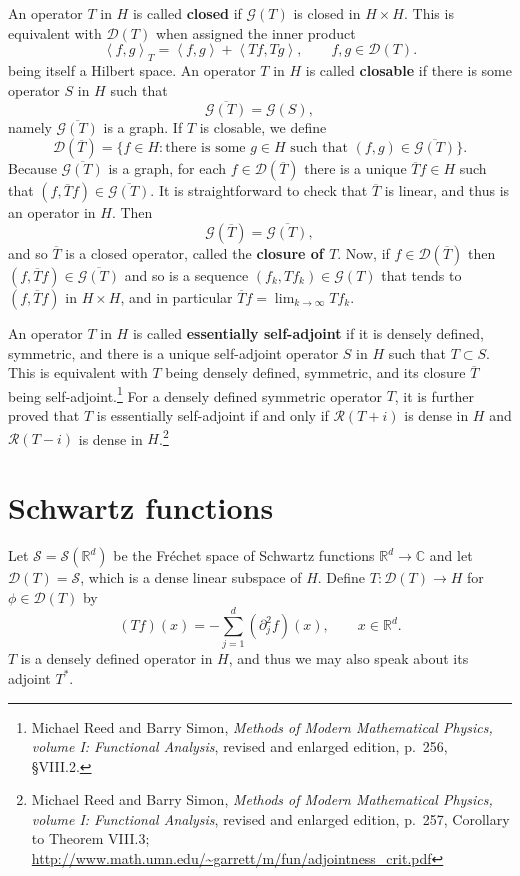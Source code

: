 \documentclass{article}
\newcommand{\inner}[2]{\left\langle #1, #2 \right\rangle}
\theoremstyle{definition}
\begin{document}
An operator $T$ in $H$ is called \textbf{closed} if $\mathscr{G}(T)$ is closed in $H \times H$. 
This is equivalent with $\mathscr{D}(T)$ when assigned the inner product
\begin{equation}
\inner{f}{g}_T = \inner{f}{g}+\inner{Tf}{Tg}, \qquad f,g \in \mathscr{D}(T).
\label{subspace}
\end{equation}
being itself a Hilbert space. 
An operator $T$ in $H$ is called \textbf{closable} if there is some operator $S$ in
$H$ such that 
\[
\overline{\mathscr{G}(T)} = \mathscr{G}(S),
\]
namely $\overline{\mathscr{G}(T)}$ is a graph.
If $T$ is closable, we define
\[
\mathscr{D}(\overline{T}) = \{f \in H: \textrm{there is some $g \in H$ such that $(f,g) \in \overline{\mathscr{G}(T)}$}\}. 
\]
Because $\overline{\mathscr{G}(T)}$ is a graph, for each $f \in \mathscr{D}(\overline{T})$ there is a unique
$\overline{T}f \in H$ such that $(f,\overline{T}f) \in \overline{\mathscr{G}(T)}$. 
It is straightforward to check that $\overline{T}$ is linear, and thus is an operator in $H$.
Then
\[
\mathscr{G}(\overline{T}) = \overline{\mathscr{G}(T)},
\]
and so $\overline{T}$ is a closed operator, called the \textbf{closure of $T$}.
Now, if $f \in \mathscr{D}(\overline{T})$ then $(f,\overline{T}f) \in \overline{\mathscr{G}(T)}$ and so is a sequence
$(f_k,Tf_k) \in \mathscr{G}(T)$ that tends to $(f,\overline{T}f)$ in $H \times H$, and in particular
$\overline{T}f = \lim_{k \to \infty} Tf_k$. 

An operator $T$ in $H$ is called \textbf{essentially self-adjoint} if it is densely defined, symmetric, and there is a unique
self-adjoint operator $S$ in $H$ such that $T \subset S$. This is equivalent with $T$ being densely defined, symmetric, and 
its closure $\overline{T}$ being self-adjoint.\footnote{Michael Reed and Barry Simon, {\em Methods of Modern Mathematical Physics,
volume I: Functional Analysis}, revised and enlarged edition, p.~256, \S VIII.2.}
For a densely defined symmetric operator $T$, it is further proved that $T$ is essentially self-adjoint if and only if
$\mathscr{R}(T+i)$ is dense in $H$ and $\mathscr{R}(T-i)$ is dense in $H$.\footnote{Michael Reed and Barry Simon, {\em Methods of Modern Mathematical Physics,
volume I: Functional Analysis}, revised and enlarged edition, p.~257, Corollary to Theorem VIII.3;
\url{http://www.math.umn.edu/~garrett/m/fun/adjointness_crit.pdf}}



\section{Schwartz functions}
Let $\mathscr{S}=\mathscr{S}(\mathbb{R}^d)$ be the Fr\'echet space of Schwartz functions $\mathbb{R}^d \to \mathbb{C}$ and
let $\mathscr{D}(T)=\mathscr{S}$, which is a dense linear subspace of $H$.
Define $T:\mathscr{D}(T) \to H$ for $\phi \in \mathscr{D}(T)$ by
\[
(T f)(x) = -\sum_{j=1}^d (\partial_j^2 f)(x),\qquad x \in \mathbb{R}^d.
\]
$T$ is a densely defined operator in $H$, and thus we may also speak about its adjoint $T^*$.
\end{document}
